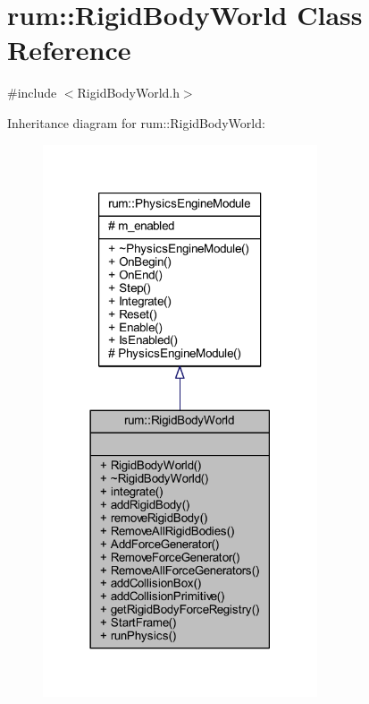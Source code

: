 \hypertarget{classrum_1_1_rigid_body_world}{}\section{rum\+:\+:Rigid\+Body\+World Class Reference}
\label{classrum_1_1_rigid_body_world}


{\ttfamily \#include $<$Rigid\+Body\+World.\+h$>$}



Inheritance diagram for rum\+:\+:Rigid\+Body\+World\+:\nopagebreak
\begin{figure}[H]
\begin{center}
\leavevmode
\includegraphics[width=230pt]{classrum_1_1_rigid_body_world__inherit__graph}
\end{center}
\end{figure}


